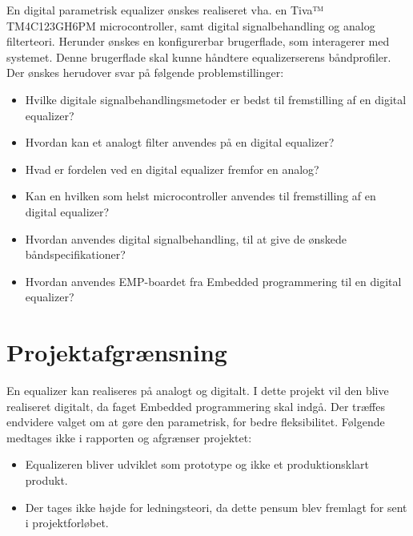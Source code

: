 En digital parametrisk equalizer ønskes realiseret vha. en Tiva™ TM4C123GH6PM microcontroller, samt digital signalbehandling og analog filterteori. Herunder ønskes en konfigurerbar brugerflade, som interagerer med systemet. Denne brugerflade skal kunne håndtere equalizerserens båndprofiler.\\

Der ønskes herudover svar på følgende problemstillinger:
\begin{itemize}[noitemsep,nolistsep]
	\item Hvilke digitale signalbehandlingsmetoder er bedst til fremstilling af en digital equalizer?
	\item Hvordan kan et analogt filter anvendes på en digital equalizer?
	\item Hvad er fordelen ved en digital equalizer fremfor en analog?
	\item Kan en hvilken som helst microcontroller anvendes til fremstilling af en digital equalizer?
	\item Hvordan anvendes digital signalbehandling, til at give de ønskede båndspecifikationer?
	\item Hvordan anvendes EMP-boardet fra Embedded programmering til en digital equalizer?
\end{itemize}

\section{Projektafgrænsning}

En equalizer kan realiseres på analogt og digitalt. I dette projekt vil den blive realiseret digitalt, da faget Embedded programmering skal indgå. Der træffes endvidere valget om at gøre den parametrisk, for bedre fleksibilitet. Følgende medtages ikke i rapporten og afgrænser projektet:
\begin{itemize}[noitemsep,nolistsep]
	\item Equalizeren bliver udviklet som prototype og ikke et produktionsklart produkt.
	\item Der tages ikke højde for ledningsteori, da dette pensum blev fremlagt for sent i projektforløbet.
\end{itemize}

